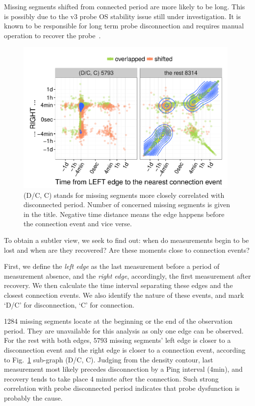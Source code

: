 Missing segments shifted from connected period are more likely to be long. This is possibly due to the v3 probe OS stability issue still under investigation. It is known to be responsible for long term probe disconnection and requires manual operation to recover the probe~\cite{usb, 1look, 2look, 3look}.

\begin{figure}[!htb]
\centering
\includegraphics[width=0.98\textwidth]{gfx/chap3/all.pdf}
\caption{(D/C, C) stands for missing segments more closely correlated with disconnected period.
Number of concerned missing segments is given in the title. Negative time distance means the edge happens before the connection event and vice verse.}
\label{fig:all}
\end{figure}

To obtain a subtler view, we seek to find out: when do measurements begin to be lost and when are they recovered? Are these moments close to connection events?

First, we define the \textit{left edge} as the last measurement before a period of measurement absence, and the \textit{right edge}, accordingly, the first measurement after recovery. 
We then calculate the time interval separating these edges and the closest connection events. We also identify the nature of these events, and mark `D/C' for disconnection, `C' for connection. 

1284 missing segments locate at the beginning or the end of the observation period. 
They are unavailable for this analysis as only one edge can be observed.
For the rest with both edges, 5793 missing segments' left edge is closer to a disconnection event and the right edge is closer to a connection event, according to Fig.~\ref{fig:all} sub-graph (D/C, C).
Judging from the density contour, last measurement most likely precedes disconnection by a Ping interval (4min), and recovery tends to take place 4 minute after the connection.
Such strong correlation with probe disconnected period indicates that probe dysfunction is probably the cause.

